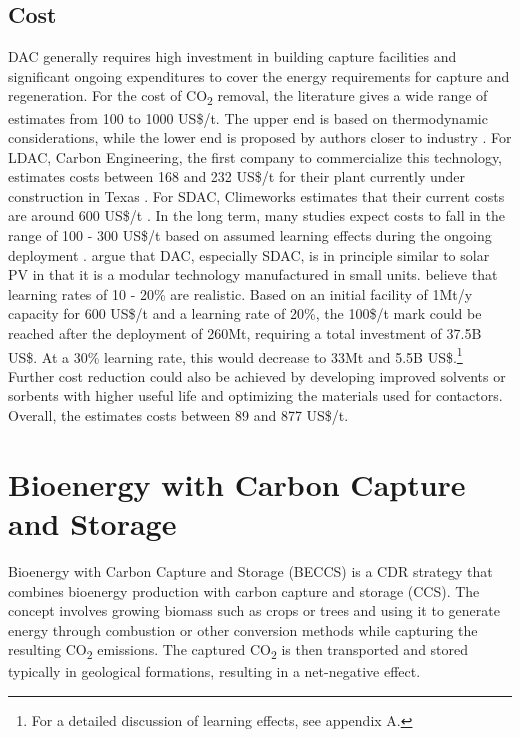 \subsection*{Cost}
DAC generally requires high investment in building capture facilities and significant ongoing expenditures to cover the energy requirements for capture and regeneration.
For the cost of CO\textsubscript{2} removal, the literature gives a wide range of estimates from 100 to 1000 US\$/t. The upper end is based on thermodynamic considerations, while the lower end is proposed by authors closer to industry \parencite{Ishimoto2017PUTTINGCONTEXT, NRC2015ClimateSequestration}.
For LDAC, Carbon Engineering, the first company to commercialize this technology, estimates costs between 168 and 232 US\$/t for their plant currently under construction in Texas \parencite{McQueen2021AFuture}. For SDAC, Climeworks estimates that their current costs are around 600 US\$/t \parencite[220]{NAS2018NegativeAgenda}.
In the long term, many studies expect costs to fall in the range of 100 - 300 US\$/t based on assumed learning effects during the ongoing deployment \parencite{Mulligan2020CarbonShot:States, McQueen2021AFuture, NAS2018NegativeAgenda}. \textcite{Lackner2021BuyingCapture} argue that DAC, especially SDAC, is in principle similar to solar PV in that it is a modular technology manufactured in small units. \textcite{McQueen2021AFuture} believe that learning rates of 10 - 20\% are realistic. Based on an initial facility of 1Mt/y capacity for 600 US\$/t and a learning rate of 20\%, the 100\$/t mark could be reached after the deployment of 260Mt, requiring a total investment of 37.5B US\$. At a 30\% learning rate, this would decrease to 33Mt and 5.5B US\$.\footnote{For a detailed discussion of learning effects, see appendix A.}
Further cost reduction could also be achieved by developing improved solvents or sorbents with higher useful life and optimizing the materials used for contactors.
Overall, the \textcite{NAS2018NegativeAgenda} estimates costs between 89 and 877 US\$/t.

\section{Bioenergy with Carbon Capture and Storage}
Bioenergy with Carbon Capture and Storage (BECCS) is a CDR strategy that combines bioenergy production with carbon capture and storage (CCS). The concept involves growing biomass such as crops or trees and using it to generate energy through combustion or other conversion methods while capturing the resulting CO\textsubscript{2} emissions. The captured CO\textsubscript{2} is then transported and stored typically in geological formations, resulting in a net-negative effect.
